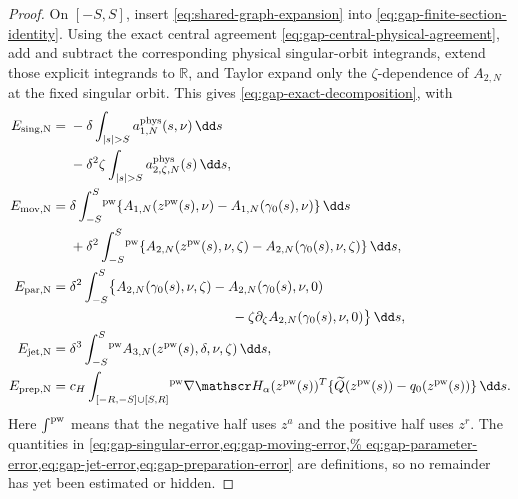 \begin{proof}
On \([-S,S]\), insert
\cref{eq:shared-graph-expansion} into
\cref{eq:gap-finite-section-identity}.  Using the exact central agreement
\cref{eq:gap-central-physical-agreement}, add and subtract the corresponding
physical singular-orbit integrands, extend those explicit integrands to
\(\mathbb R\), and Taylor expand only the \(\zeta\)-dependence of
\(A_{2,N}\) at the fixed singular orbit.  This gives
\cref{eq:gap-exact-decomposition}, with
\begin{align}
 E_{\rm sing,N}
 ={}&-\delta\int_{|s|>S}a^{\rm phys}_{1,N}(s,\nu)\,\dd s\notag\\
 &-\delta^2\zeta\int_{|s|>S}
       a^{\rm phys}_{2,\zeta,N}(s)\,\dd s,
                                                        \label{eq:gap-singular-error}\\
 E_{\rm mov,N}
 ={}&\delta\int_{-S}^{S}\!{}^{\rm pw}
       \{A_{1,N}(z^{\rm pw}(s),\nu)
               -A_{1,N}(\gamma_0(s),\nu)\}\,\dd s\notag\\
 &+\delta^2\int_{-S}^{S}\!{}^{\rm pw}
       \{A_{2,N}(z^{\rm pw}(s),\nu,\zeta)
               -A_{2,N}(\gamma_0(s),\nu,\zeta)\}\,\dd s,
                                                        \label{eq:gap-moving-error}\\
 E_{\rm par,N}
 ={}&\delta^2\int_{-S}^{S}
       \bigl\{A_{2,N}(\gamma_0(s),\nu,\zeta)
             -A_{2,N}(\gamma_0(s),\nu,0)\notag\\
 &\hspace{42mm}
             -\zeta\partial_\zeta
                    A_{2,N}(\gamma_0(s),\nu,0)\bigr\}\,\dd s,
                                                        \label{eq:gap-parameter-error}\\
 E_{\rm jet,N}
 ={}&\delta^3\int_{-S}^{S}\!{}^{\rm pw}
       A_{3,N}(z^{\rm pw}(s),\delta,\nu,\zeta)\,\dd s,
                                                        \label{eq:gap-jet-error}\\
 E_{\rm prep,N}
 ={}&c_H\int_{[-R,-S]\cup[S,R]}\!{}^{\rm pw}
       \nabla\mathscr H_\alpha(z^{\rm pw}(s))^T
       \{\widetilde Q(z^{\rm pw}(s))-q_0(z^{\rm pw}(s))\}\,\dd s.
                                                        \label{eq:gap-preparation-error}
\end{align}
Here \(\int^{\rm pw}\) means that the negative half uses \(z^a\) and the
positive half uses \(z^r\).  The quantities in
\cref{eq:gap-singular-error,eq:gap-moving-error,%
eq:gap-parameter-error,eq:gap-jet-error,eq:gap-preparation-error} are
definitions, so no remainder has yet been estimated or hidden.


\end{proof}
